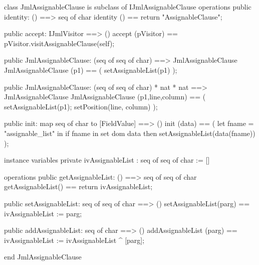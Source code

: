 \begin{vdm_al}
class JmlAssignableClause is subclass of IJmlAssignableClause
operations
  public identity: () ==> seq of char
  identity () == return "AssignableClause";

  public accept: IJmlVisitor ==> ()
  accept (pVisitor) == pVisitor.visitAssignableClause(self);

  public JmlAssignableClause:
    (seq of seq of char) ==> JmlAssignableClause
  JmlAssignableClause (p1) == 
    ( setAssignableList(p1) );

  public JmlAssignableClause:
    (seq of seq of char) *
    nat *
    nat ==> JmlAssignableClause
  JmlAssignableClause (p1,line,column) == 
    ( setAssignableList(p1);
      setPosition(line, column) );

  public init: map seq of char to [FieldValue] ==> ()
  init (data) ==
    ( let fname = "assignable_list" in
        if fname in set dom data
        then setAssignableList(data(fname)) );

instance variables
  private ivAssignableList : seq of seq of char := []

operations
  public getAssignableList: () ==> seq of seq of char
  getAssignableList() == return ivAssignableList;

  public setAssignableList: seq of seq of char ==> ()
  setAssignableList(parg) == ivAssignableList := parg;

  public addAssignableList: seq of char ==> ()
  addAssignableList (parg) == ivAssignableList := ivAssignableList ^ [parg];

end JmlAssignableClause
\end{vdm_al}

